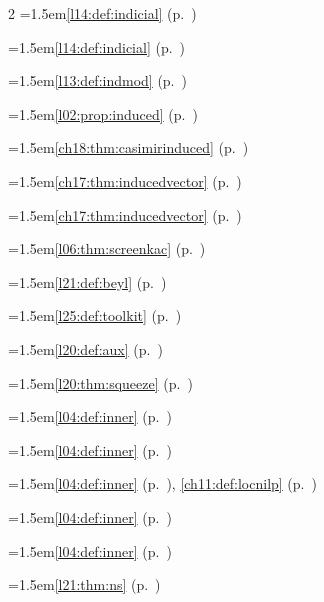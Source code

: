 \begin{multicols}{2}
\hangindent=1.5em\quad \ref{l14:def:indicial} (p.~\pageref{l14:def:indicial})\par
\hangindent=1.5em\quad \ref{l14:def:indicial} (p.~\pageref{l14:def:indicial})\par
\hangindent=1.5em\quad \ref{l13:def:indmod} (p.~\pageref{l13:def:indmod})\par
\hangindent=1.5em\quad \ref{l02:prop:induced} (p.~\pageref{l02:prop:induced})\par
\hangindent=1.5em\quad \ref{ch18:thm:casimirinduced} (p.~\pageref{ch18:thm:casimirinduced})\par
\hangindent=1.5em\quad \ref{ch17:thm:inducedvector} (p.~\pageref{ch17:thm:inducedvector})\par
\hangindent=1.5em\quad \ref{ch17:thm:inducedvector} (p.~\pageref{ch17:thm:inducedvector})\par
\hangindent=1.5em\quad \ref{l06:thm:screenkac} (p.~\pageref{l06:thm:screenkac})\par
\hangindent=1.5em\quad \ref{l21:def:beyl} (p.~\pageref{l21:def:beyl})\par
\hangindent=1.5em\quad \ref{l25:def:toolkit} (p.~\pageref{l25:def:toolkit})\par
\hangindent=1.5em\quad \ref{l20:def:aux} (p.~\pageref{l20:def:aux})\par
\hangindent=1.5em\quad \ref{l20:thm:squeeze} (p.~\pageref{l20:thm:squeeze})\par
\hangindent=1.5em\quad \ref{l04:def:inner} (p.~\pageref{l04:def:inner})\par
\hangindent=1.5em\quad \ref{l04:def:inner} (p.~\pageref{l04:def:inner})\par
\hangindent=1.5em\quad \ref{l04:def:inner} (p.~\pageref{l04:def:inner}), \ref{ch11:def:locnilp} (p.~\pageref{ch11:def:locnilp})\par
\hangindent=1.5em\quad \ref{l04:def:inner} (p.~\pageref{l04:def:inner})\par
\hangindent=1.5em\quad \ref{l04:def:inner} (p.~\pageref{l04:def:inner})\par
\hangindent=1.5em\quad \ref{l21:thm:ns} (p.~\pageref{l21:thm:ns})\par

\end{multicols}
